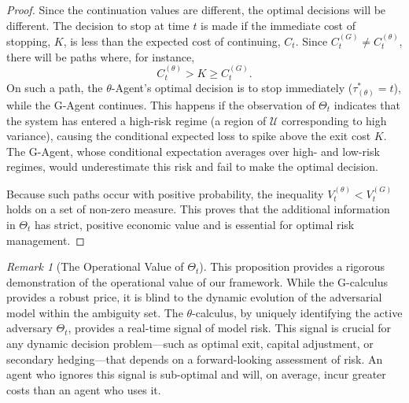 \documentclass[12pt, letterpaper]{amsart}
\newcommand{\Ucal}{\mathcal{U}}
\theoremstyle{plain}
\theoremstyle{definition}
\theoremstyle{remark}
\newtheorem{remark}[theorem]{Remark}
\numberwithin{equation}{section} %
\begin{document}
\begin{proof}
Since the continuation values are different, the optimal decisions will be different. The decision to stop at time $t$ is made if the immediate cost of stopping, $K$, is less than the expected cost of continuing, $C_t$. Since $C_t^{(G)} \neq C_t^{(\theta)}$, there will be paths where, for instance,
\[ C_t^{(\theta)} > K \ge C_t^{(G)}. \]
On such a path, the $\theta$-Agent's optimal decision is to stop immediately ($\tau^*_{(\theta)} = t$), while the G-Agent continues. This happens if the observation of $\Theta_t$ indicates that the system has entered a high-risk regime (a region of $\Ucal$ corresponding to high variance), causing the conditional expected loss to spike above the exit cost $K$. The G-Agent, whose conditional expectation averages over high- and low-risk regimes, would underestimate this risk and fail to make the optimal decision.

Because such paths occur with positive probability, the inequality $V_t^{(\theta)} < V_t^{(G)}$ holds on a set of non-zero measure. This proves that the additional information in $\Theta_t$ has strict, positive economic value and is essential for optimal risk management.
\end{proof}

\begin{remark}[The Operational Value of $\Theta_t$]
This proposition provides a rigorous demonstration of the operational value of our framework. While the G-calculus provides a robust price, it is blind to the dynamic evolution of the adversarial model within the ambiguity set. The $\theta$-calculus, by uniquely identifying the active adversary $\Theta_t$, provides a real-time signal of model risk. This signal is crucial for any dynamic decision problem—such as optimal exit, capital adjustment, or secondary hedging—that depends on a forward-looking assessment of risk. An agent who ignores this signal is sub-optimal and will, on average, incur greater costs than an agent who uses it.
\end{remark}
\end{document}
